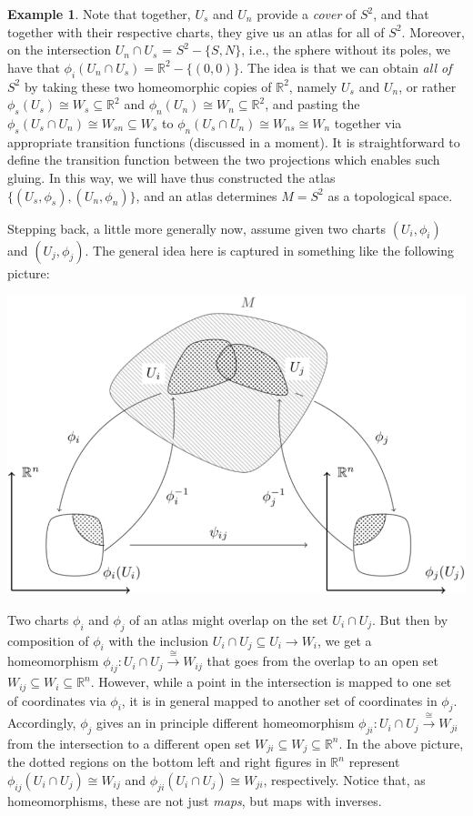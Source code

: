 \documentclass[11pt]{book}
\theoremstyle{definition}
\newtheorem{example}{Example}[section]
\theoremstyle{definition}
\theoremstyle{definition}
\theoremstyle{theorem}
\theoremstyle{definition}
\begin{document}
\begin{example}
	Note that together, $U_s$ and $U_n$ provide a \textit{cover} of $S^2$, and that together with their respective charts, they give us an atlas for all of $S^2$. Moreover, on the intersection $U_n \cap U_s$ = $S^2 - \{S,N\}$, i.e., the sphere without its poles, we have that $\phi_i(U_n \cap U_s) = \mathbb{R}^2 - \{(0,0)\}$. The idea is that we can obtain \textit{all of} $S^2$ by taking these two homeomorphic copies of $\mathbb{R}^2$, namely $U_s$ and $U_n$, or rather $\phi_s(U_s) \cong W_s \subseteq \mathbb{R}^2$ and $\phi_n(U_n) \cong W_n \subseteq \mathbb{R}^2$, and pasting the $\phi_s(U_s \cap U_n) \cong W_{sn} \subseteq W_s$ to $\phi_n(U_s \cap U_n) \cong W_{ns} \cong W_n$ together via appropriate transition functions (discussed in a moment). It is straightforward to define the transition function between the two projections which enables such gluing. In this way, we will have thus constructed the atlas $\{(U_s, \phi_s), (U_n, \phi_n)\}$, and an atlas determines $M = S^2$ as a topological space. \par 
	Stepping back, a little more generally now, assume given two charts $(U_i, \phi_i)$ and $(U_j, \phi_j)$. The general idea here is captured in something like the following picture: 
	\begin{center} 
		\includegraphics[scale=0.33]{Manifold1BW.png}
	\end{center} 
	Two charts $\phi_i$ and $\phi_j$ of an atlas might overlap on the set $U_i \cap U_j$. But then by composition of $\phi_i$ with the inclusion $U_i \cap U_j \subseteq U_i \rightarrow W_i$, we get a homeomorphism $\phi_{ij}: U_i \cap U_j \xrightarrow{\cong} W_{ij}$ that goes from the overlap to an open set $W_{ij} \subseteq W_i \subseteq \mathbb{R}^n$. However, while a point in the intersection is mapped to one set of coordinates via $\phi_i$, it is in general mapped to another set of coordinates in $\phi_j$. Accordingly, $\phi_j$ gives an in principle different homeomorphism $\phi_{ji}: U_i \cap U_j \xrightarrow{\cong} W_{ji}$ from the intersection to a different open set $W_{ji} \subseteq W_j \subseteq \mathbb{R}^n$. In the above picture, the dotted regions on the bottom left and right figures in $\mathbb{R}^n$ represent $\phi_{ij} (U_i \cap U_j) \cong W_{ij}$ and $\phi_{ji} (U_i \cap U_j) \cong W_{ji}$, respectively. Notice that, as homeomorphisms, these are not just \textit{maps}, but maps with inverses. \par 

\end{example}
\end{document}
